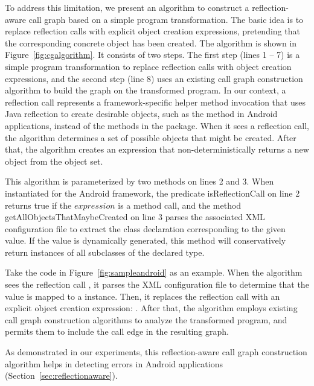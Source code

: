 To address this limitation, we present an algorithm to construct
a reflection-aware call graph based on a simple program transformation.
The basic idea is to replace reflection calls with explicit object
creation expressions, pretending that the corresponding concrete object
has been created.  The algorithm is shown in Figure~\ref{fig:cgalgorithm}.
It consists of two steps. The first step (lines 1 -- 7) is a simple program
transformation to replace reflection calls with object creation expressions, and
the second step (line 8) uses an existing call graph construction algorithm
to build the graph on the transformed program. In our context,
a reflection call represents a framework-specific helper method invocation
that uses Java reflection to create desirable objects, such as
the  method in Android applications, instead
of the methods in the  package.
When it sees a reflection call, the algorithm
determines a set of possible objects that might be created.
After that, the algorithm creates an expression that non-deterministically
returns a new object from the object set.

This algorithm is parameterized by two methods on
lines 2 and 3. When instantiated for the Android framework,
the predicate isReflectionCall on line 2 returns true
if the $expression$ is a  method call, and the method
getAllObjectsThatMaybeCreated on line 3 parses the associated XML configuration
file to extract the class declaration
 corresponding to the given  value. If the 
value is dynamically generated, this method will conservatively
return instances of all subclasses of the declared type.

Take the code in Figure~\ref{fig:sampleandroid} as an example.
When the algorithm sees the reflection call
, it
parses the XML configuration file to determine that the 
value is mapped to a  instance. Then, it
replaces the reflection call
with an explicit object creation expression: .
After that, the algorithm employs existing call graph construction
algorithms to analyze the transformed program, and permits them
to include the call edge  in the resulting graph.

As demonstrated in our experiments, this reflection-aware call
graph construction algorithm helps in detecting errors
in Android applications (Section~\ref{sec:reflectionaware}).


